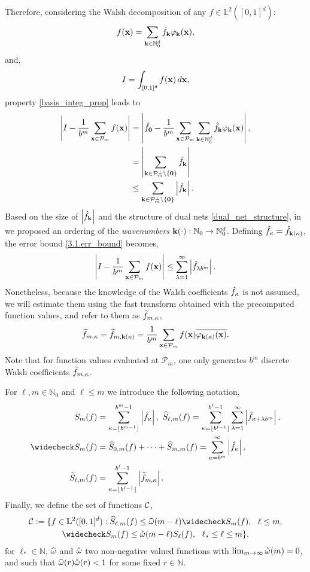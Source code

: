 Therefore, considering the Walsh decomposition of any $f\in \mathbb{L}^2([0,1]^d)$: \[
f(\boldsymbol{\mathbf{x}})=\sum_{\boldsymbol{\mathbf{k}}\in\mathbb{N}_0^d}\hat{f}_{\boldsymbol{\mathbf{k}}}\varphi_{\boldsymbol{\mathbf{k}}}(\boldsymbol{\mathbf{x}}), \]
and,
\[ I = \int_{[0,1]^d} f(\boldsymbol{\mathbf{x}})\,d\boldsymbol{\mathbf{x}},\]
property \eqref{basis_integ_prop} leads to
\begin{align}
\nonumber
\left\lvert I - \frac{1}{b^m}\sum_{\boldsymbol{\mathbf{x}}\in\mathcal{P}_m}f(\boldsymbol{\mathbf{x}})\right\rvert &=
\left\lvert\hat{f}_{\boldsymbol{\mathbf{0}}} - \frac{1}{b^m}\sum_{\boldsymbol{\mathbf{x}}\in\mathcal{P}_m}\sum_{\boldsymbol{\mathbf{k}}\in\mathbb{N}_0^d}\hat{f}_{\boldsymbol{\mathbf{k}}}\varphi_{\boldsymbol{\mathbf{k}}}(\boldsymbol{\mathbf{x}})\right\rvert, \\
\nonumber
&= \left\lvert\sum_{\boldsymbol{\mathbf{k}}\in\mathcal{P}_m^\perp\setminus\{\boldsymbol{\mathbf{0}}\}}\hat{f}_{\boldsymbol{\mathbf{k}}}\right\rvert \\
& \leq \sum_{\boldsymbol{\mathbf{k}}\in\mathcal{P}_m^\perp\setminus\{\boldsymbol{\mathbf{0}}\}}\left\lvert\hat{f}_{\boldsymbol{\mathbf{k}}}\right\rvert. \label{3.1.err_bound}
\end{align}
Based on the size of $\left\lvert\hat{f}_{\boldsymbol{\mathbf{k}}}\right\rvert$ and the structure of dual nets \eqref{dual_net_structure}, in \cite[Sec. 4.1]{HicJim} we proposed an ordering of the \emph{wavenumbers} $\boldsymbol{\mathbf{k}}(\cdot):\mathbb{N}_0\rightarrow\mathbb{N}_0^d$. Defining $\hat{f}_{\kappa}=\hat{f}_{\boldsymbol{\mathbf{k}}(\kappa)}$, the error bound \eqref{3.1.err_bound} becomes,
\begin{equation}
\left\lvert I - \frac{1}{b^m}\sum_{\boldsymbol{\mathbf{x}}\in\mathcal{P}_m}f(\boldsymbol{\mathbf{x}})\right\rvert \le \sum_{\lambda=1}^{\infty} \left \lvert \hat{f}_{\lambda b^m}\right \rvert.
\end{equation}
Nonetheless, because the knowledge of the Walsh coefficients $\hat{f}_{\kappa}$ is not assumed, we will estimate them using the fast transform obtained with the precomputed function values, and refer to them as $\widetilde{f}_{m,\kappa}$,
\[
\widetilde{f}_{m,\kappa}=\widetilde{f}_{m,\boldsymbol{\mathbf{k}}(\kappa)}=\frac{1}{b^m}\sum_{\boldsymbol{\mathbf{x}}\in\mathcal{P}_m}f(\boldsymbol{\mathbf{x}})\overline{\varphi_{\boldsymbol{\mathbf{k}}(\kappa)}(\boldsymbol{\mathbf{x}})}.
\]
Note that for function values evaluated at $\mathcal{P}_m$, one only generates $b^m$ discrete Walsh coefficients $\widetilde{f}_{m,\kappa}$.

For $\ell,m \in \mathbb{N}_0$ and $\ell \le m$ we introduce the following notation,
\begin{align*}
S_m(f) &=  \sum_{\kappa=\left \lfloor b^{m-1} \right \rfloor}^{b^{m}-1} \absolute{\hf_{\kappa}}, \ 
\hS_{\ell,m}(f)  = \sum_{\kappa=\left \lfloor b^{\ell-1} \right \rfloor}^{b^{\ell}-1} \sum_{\lambda=1}^{\infty} \absolute{ \hf_{\kappa+\lambda b^{m}}}, \\
\wcS_m(f)&=\hS_{0,m}(f) + \cdots + \hS_{m,m}(f)=
\sum_{\kappa=b^{m}}^{\infty} \absolute{\hf_{\kappa}},\\ 
\tS_{\ell,m}(f) &= \sum_{\kappa=\left \lfloor b^{\ell-1}\right \rfloor}^{b^{\ell}-1} \absolute{\tf_{m,\kappa}}.
\end{align*}
Finally, we define the set of functions $\mathcal{C}$,
\begin{multline} \label{conecond}
\cc:=\{f \in \mathbb{L}^2(\cube) : \hS_{\ell,m}(f) \le \homega(m-\ell) \wcS_m(f),\ \ \ell \le m, \\
\wcS_m(f) \le \wcomega(m-\ell) S_{\ell}(f),\ \  \ell_* \le \ell \le m\}.
\end{multline}
for $\ell_* \in \mathbb{N}$, $\widehat{\omega}$ and $\mathring{\omega}$ two non-negative valued functions with $\lim_{m \to \infty} \mathring{\omega}(m) = 0$, and such that $\widehat{\omega}(r)\mathring{\omega}(r)<1$ for some fixed $r\in\mathbb{N}$.

